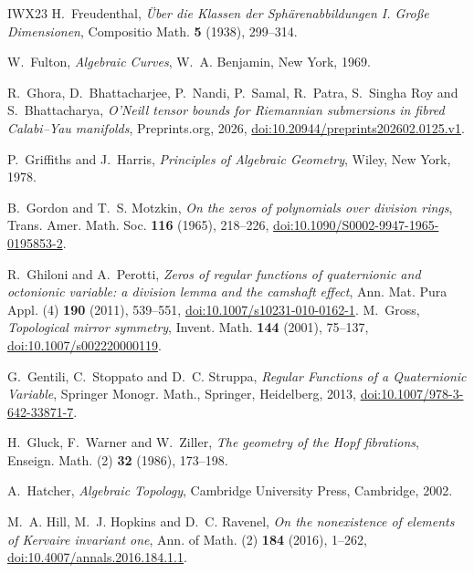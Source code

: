 \documentclass[11pt]{amsart}
\numberwithin{equation}{section}
\theoremstyle{plain}
\theoremstyle{definition}
\theoremstyle{remark}
\begin{document}
\begin{thebibliography}{IWX23}
 H.~Freudenthal, \emph{\"Uber die Klassen der Sph\"arenabbildungen I. Gro\ss e Dimensionen}, Compositio Math. \textbf{5} (1938), 299--314.

 W.~Fulton, \emph{Algebraic Curves}, W.~A. Benjamin, New York, 1969.

 R.~Ghora, D.~Bhattacharjee, P.~Nandi, P.~Samal, R.~Patra, S.~Singha Roy and S.~Bhattacharya, \emph{O'Neill tensor bounds for Riemannian submersions in fibred Calabi--Yau manifolds}, Preprints.org, 2026, \href{https://doi.org/10.20944/preprints202602.0125.v1}{doi:10.20944/preprints202602.0125.v1}.

 P.~Griffiths and J.~Harris, \emph{Principles of Algebraic Geometry}, Wiley, New York, 1978.

 B.~Gordon and T.~S. Motzkin, \emph{On the zeros of polynomials over division rings}, Trans. Amer. Math. Soc. \textbf{116} (1965), 218--226, \href{https://doi.org/10.1090/S0002-9947-1965-0195853-2}{doi:10.1090/S0002-9947-1965-0195853-2}.

 R.~Ghiloni and A.~Perotti, \emph{Zeros of regular functions of quaternionic and octonionic variable: a division lemma and the camshaft effect}, Ann. Mat. Pura Appl. (4) \textbf{190} (2011), 539--551, \href{https://doi.org/10.1007/s10231-010-0162-1}{doi:10.1007/s10231-010-0162-1}.
 M.~Gross, \emph{Topological mirror symmetry}, Invent. Math. \textbf{144} (2001), 75--137, \href{https://doi.org/10.1007/s002220000119}{doi:10.1007/s002220000119}.

 G.~Gentili, C.~Stoppato and D.~C. Struppa, \emph{Regular Functions of a Quaternionic Variable}, Springer Monogr. Math., Springer, Heidelberg, 2013, \href{https://doi.org/10.1007/978-3-642-33871-7}{doi:10.1007/978-3-642-33871-7}.

 H.~Gluck, F.~Warner and W.~Ziller, \emph{The geometry of the Hopf fibrations}, Enseign. Math. (2) \textbf{32} (1986), 173--198.

 A.~Hatcher, \emph{Algebraic Topology}, Cambridge University Press, Cambridge, 2002.

 M.~A. Hill, M.~J. Hopkins and D.~C. Ravenel, \emph{On the nonexistence of elements of Kervaire invariant one}, Ann. of Math. (2) \textbf{184} (2016), 1--262, \href{https://doi.org/10.4007/annals.2016.184.1.1}{doi:10.4007/annals.2016.184.1.1}.


\end{thebibliography}
\end{document}
